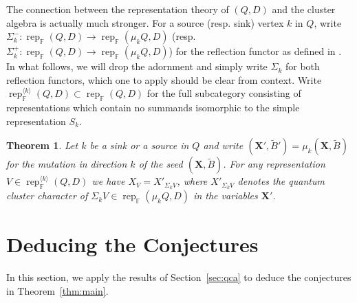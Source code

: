 \documentclass[12pt]{amsart}
\newtheorem{theorem}{Theorem}
\newcommand{\bfX}{\mathbf{X}}
\newcommand{\FF}{\mathbb{F}}
\newcommand{\rep}{\operatorname{rep}}
\begin{document}
  The connection between the representation theory of $(Q,D)$ and the cluster algebra is actually much stronger.
  For a source (resp. sink) vertex $k$ in $Q$, write $\Sigma_k^-:\rep_\FF(Q,D)\to\rep_\FF(\mu_kQ,D)$ (resp. $\Sigma_k^+:\rep_\FF(Q,D)\to\rep_\FF(\mu_kQ,D)$) for the reflection functor as defined in \cite[Sec. 2]{dlab-ringel}.  
  In what follows, we will drop the adornment and simply write $\Sigma_k$ for both reflection functors, which one to apply should be clear from context.
  Write $\rep_\FF^{\langle k\rangle}(Q,D)\subset\rep_\FF(Q,D)$ for the full subcategory consisting of representations which contain no summands isomorphic to the simple representation $S_k$.
  \begin{theorem}\cite{rupel1}
    \label{th:reflection functor}
    Let $k$ be a sink or a source in $Q$ and write $(\bfX',\widetilde{B}')=\mu_k(\bfX,\widetilde{B})$ for the mutation in direction $k$ of the seed $(\bfX,\widetilde{B})$.  
    For any representation $V\in\rep_\FF^{\langle k\rangle}(Q,D)$ we have $X_V=X'_{\Sigma_kV}$, where $X'_{\Sigma_kV}$ denotes the quantum cluster character of $\Sigma_kV\in\rep_\FF(\mu_kQ,D)$ in the variables $\bfX'$.
  \end{theorem}


\section{Deducing the Conjectures}
In this section, we apply the results of Section~\ref{sec:qca} to deduce the conjectures in Theorem~\ref{thm:main}.
\end{document}
